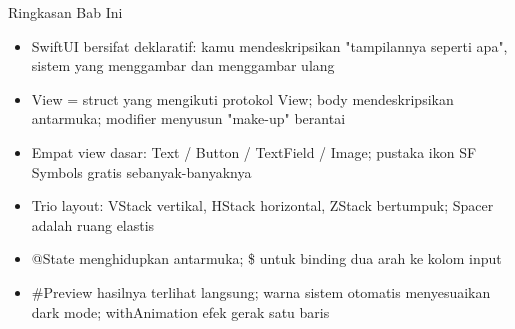 \begin{tcbsummary}{Ringkasan Bab Ini}
\begin{itemize}
  \item SwiftUI bersifat deklaratif: kamu mendeskripsikan "tampilannya seperti apa", sistem yang menggambar dan menggambar ulang
  \item View = struct yang mengikuti protokol View; body mendeskripsikan antarmuka; modifier menyusun "make-up" berantai
  \item Empat view dasar: Text / Button / TextField / Image; pustaka ikon SF Symbols gratis sebanyak-banyaknya
  \item Trio layout: VStack vertikal, HStack horizontal, ZStack bertumpuk; Spacer adalah ruang elastis
  \item @State menghidupkan antarmuka; \$ untuk binding dua arah ke kolom input
  \item \#Preview hasilnya terlihat langsung; warna sistem otomatis menyesuaikan dark mode; withAnimation efek gerak satu baris
\end{itemize}

\end{tcbsummary}
